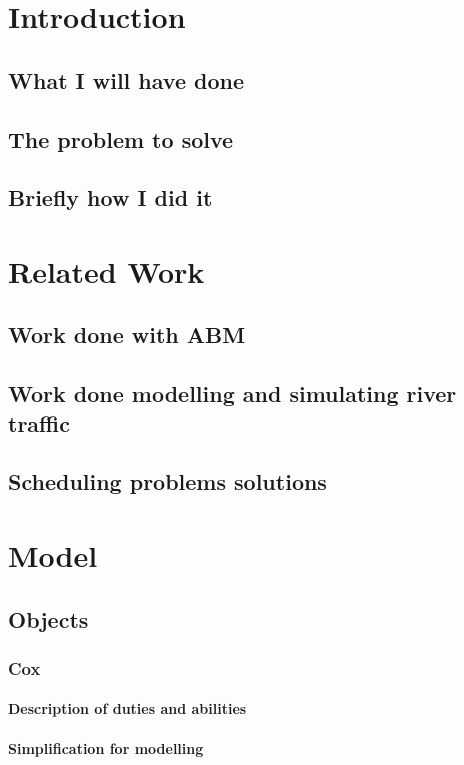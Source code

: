 \chapter{Introduction}
  \section{What I will have done}
  
  \section{The problem to solve}
  
  \section{Briefly how I did it}

\chapter{Related Work}
  \section{Work done with ABM}

  \section{Work done modelling and simulating river traffic}

  \section{Scheduling problems solutions}

\chapter{Model}
  \section{Objects}
    \subsection{Cox}
      \subsubsection{Description of duties and abilities}
      \subsubsection{Simplification for modelling}
      
